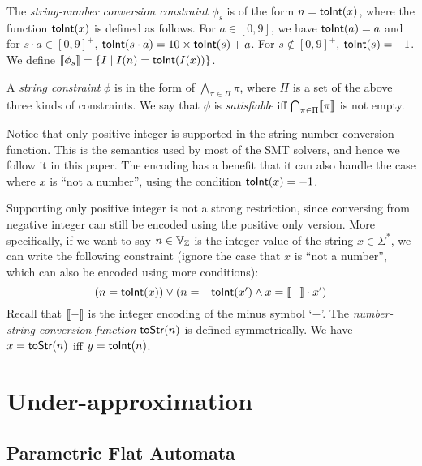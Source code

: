 \documentclass[sigplan,review,anonymous]{acmart}\settopmatter{printfolios=true,printccs=false,printacmref=false}
\begin{document}
The \emph{string-number conversion constraint} $\phi_s$ is of the form $n=\mbox{\textsf{toInt}($x$)}$, where the function $\mbox{\textsf{toInt}($x$)}$ is defined as follows. For $a\in [0,9]$, we have $\mbox{\textsf{toInt}($a$)}=a$ and for $s \cdot a \in [0,9]^+$, $\mbox{\textsf{toInt}($s\cdot a$)} = 10\times \mbox{\textsf{toInt}($s$)}+a$. For $s\notin [0,9]^+$, $\mbox{\textsf{toInt}($s$)}=-1$. We define  $[\![\phi_s]\!]= \{I \mid I(n)= \mbox{\textsf{toInt}($I(x)$)} \}$.

A \emph{string constraint} $\phi$ is in the form of $\bigwedge_{\pi \in \Pi} \pi$, where $\Pi$ is a set of the above three kinds of constraints. We say that $\phi$ is \emph{satisfiable}  iff $\bigcap_{\pi \in \Pi} [\![\pi]\!]$ is not empty.

Notice that only positive integer is supported in the string-number conversion function. This is the semantics used by most of the SMT solvers, and hence we follow it in this paper. The encoding has a benefit that it can also handle the case where $x$ is ``not a number'', using the condition $\mbox{\textsf{toInt}($x$)} = -1$.

Supporting only positive integer is not a strong restriction, since conversing from negative integer can still be encoded using the positive only version. More specifically, if we want to say $n \in \mbox{$\mathbb{V}_{\mathbb{Z}}$}$ is the integer value of the string $x \in \Sigma^*$, we can write the following constraint (ignore the case that $x$ is ``not a number'', which can also be encoded using more conditions):
$$(n= \mbox{\textsf{toInt}($x$)}) \vee (n=-\mbox{\textsf{toInt}($x'$)} \wedge x = [\![-]\!]\cdot x')$$
Recall that $[\![-]\!]$ is the integer encoding of the minus symbol `$-$'. The \emph{number-string conversion function} $\mbox{\textsf{toStr}($n$)}$ is defined symmetrically. We have $x = \mbox{\textsf{toStr}($n$)}$ iff $y= \mbox{\textsf{toInt}($n$)}$. 


\section{Under-approximation}

\subsection{Parametric Flat Automata} \label{section:sfa}
\newcommand{\st}[2]{q_{#1}^{#2}}
\newcommand{\sym}[2]{v_{#1}^{#2}}
\end{document}
